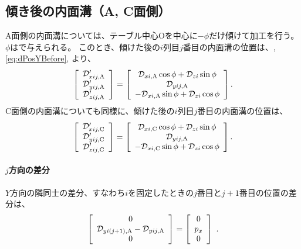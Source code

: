 \subsection{傾き後の内面溝（A, C面側）}
A面側の内面溝については、テーブル中心Oを中心に$-\phi$だけ傾けて加工を行う。
$\phi$はで与えられる。
このとき、傾けた後の$i$列目$j$番目の内面溝の位置は、, \eqref{eq:dPosYBefore}, より、
\begin{align*}
  \left[
  \begin{array}{c}
    \mathcal D_{xij,\text A}'\\
    \mathcal D_{yij,\text A}'\\
    \mathcal D_{zij,\text A}'
  \end{array}
  \right]
  = \left[
    \begin{array}{c}
      \mathcal D_{xi,\text A}\cos\phi+\mathcal D_{zi}\sin\phi\\
      \mathcal D_{yij,\text A}\\
      -\mathcal D_{xi,\text A}\sin\phi+\mathcal D_{zi}\cos\phi
    \end{array}
    \right].
\end{align*}
C面側の内面溝についても同様に、傾けた後の$i$列目$j$番目の内面溝の位置は、
\begin{align*}
  \left[
  \begin{array}{c}
    \mathcal D_{xij,\text C}'\\
    \mathcal D_{yij,\text C}'\\
    \mathcal D_{zij,\text C}'
  \end{array}
  \right]
  = \left[
    \begin{array}{c}
      \mathcal D_{xi,\text C}\cos\phi+\mathcal D_{zi}\sin\phi\\
      \mathcal D_{yij,\text A}\\
      -\mathcal D_{xi,\text C}\sin\phi+\mathcal D_{zi}\cos\phi
    \end{array}
    \right].
\end{align*}


\paragraph{$j$方向の差分}\noindent
$Y$方向の隣同士の差分、すなわち$i$を固定したときの$j$番目と$j+1$番目の位置の差分は、
\begin{align*}
  \left[
  \begin{array}{c}
    0\\
    \mathcal D_{yi(j+1),\text A}-\mathcal D_{yij,\text A}\\
    0
  \end{array}
  \right]
  = \left[
    \begin{array}{c}
      0\\
      p_x\\
      0
    \end{array}
    \right]\ .
\end{align*}


